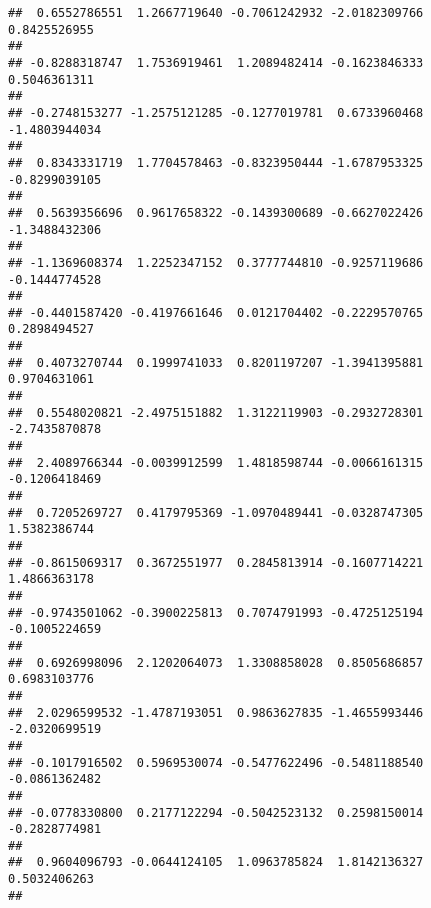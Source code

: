 \documentclass[]{article}
\begin{document}
\begin{verbatim}
##  0.6552786551  1.2667719640 -0.7061242932 -2.0182309766  0.8425526955 
##                                                                       
## -0.8288318747  1.7536919461  1.2089482414 -0.1623846333  0.5046361311 
##                                                                       
## -0.2748153277 -1.2575121285 -0.1277019781  0.6733960468 -1.4803944034 
##                                                                       
##  0.8343331719  1.7704578463 -0.8323950444 -1.6787953325 -0.8299039105 
##                                                                       
##  0.5639356696  0.9617658322 -0.1439300689 -0.6627022426 -1.3488432306 
##                                                                       
## -1.1369608374  1.2252347152  0.3777744810 -0.9257119686 -0.1444774528 
##                                                                       
## -0.4401587420 -0.4197661646  0.0121704402 -0.2229570765  0.2898494527 
##                                                                       
##  0.4073270744  0.1999741033  0.8201197207 -1.3941395881  0.9704631061 
##                                                                       
##  0.5548020821 -2.4975151882  1.3122119903 -0.2932728301 -2.7435870878 
##                                                                       
##  2.4089766344 -0.0039912599  1.4818598744 -0.0066161315 -0.1206418469 
##                                                                       
##  0.7205269727  0.4179795369 -1.0970489441 -0.0328747305  1.5382386744 
##                                                                       
## -0.8615069317  0.3672551977  0.2845813914 -0.1607714221  1.4866363178 
##                                                                       
## -0.9743501062 -0.3900225813  0.7074791993 -0.4725125194 -0.1005224659 
##                                                                       
##  0.6926998096  2.1202064073  1.3308858028  0.8505686857  0.6983103776 
##                                                                       
##  2.0296599532 -1.4787193051  0.9863627835 -1.4655993446 -2.0320699519 
##                                                                       
## -0.1017916502  0.5969530074 -0.5477622496 -0.5481188540 -0.0861362482 
##                                                                       
## -0.0778330800  0.2177122294 -0.5042523132  0.2598150014 -0.2828774981 
##                                                                       
##  0.9604096793 -0.0644124105  1.0963785824  1.8142136327  0.5032406263 
##                                                                       

\end{verbatim}
\end{document}
